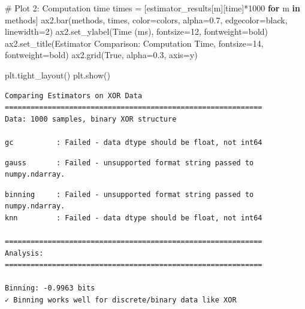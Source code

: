 \documentclass[
  11pt,
  letterpaper,
  oneside,
  openany]{book}
\newenvironment{Shaded}{\begin{snugshade}}{\end{snugshade}}
\newcommand{\CommentTok}[1]{\textcolor[rgb]{0.37,0.37,0.37}{#1}}
\newcommand{\ControlFlowTok}[1]{\textcolor[rgb]{0.00,0.23,0.31}{\textbf{#1}}}
\newcommand{\DecValTok}[1]{\textcolor[rgb]{0.68,0.00,0.00}{#1}}
\newcommand{\FloatTok}[1]{\textcolor[rgb]{0.68,0.00,0.00}{#1}}
\newcommand{\KeywordTok}[1]{\textcolor[rgb]{0.00,0.23,0.31}{\textbf{#1}}}
\newcommand{\NormalTok}[1]{\textcolor[rgb]{0.00,0.23,0.31}{#1}}
\newcommand{\OperatorTok}[1]{\textcolor[rgb]{0.37,0.37,0.37}{#1}}
\newcommand{\StringTok}[1]{\textcolor[rgb]{0.13,0.47,0.30}{#1}}
\newcommand{\VariableTok}[1]{\textcolor[rgb]{0.07,0.07,0.07}{#1}}
\begin{document}
\begin{Shaded}
\begin{Highlighting}[]
    \CommentTok{\# Plot 2: Computation time}
\NormalTok{    times }\OperatorTok{=}\NormalTok{ [estimator\_results[m][}\StringTok{\textquotesingle{}time\textquotesingle{}}\NormalTok{]}\OperatorTok{*}\DecValTok{1000} \ControlFlowTok{for}\NormalTok{ m }\KeywordTok{in}\NormalTok{ methods]}
\NormalTok{    ax2.bar(methods, times, color}\OperatorTok{=}\NormalTok{colors, alpha}\OperatorTok{=}\FloatTok{0.7}\NormalTok{, edgecolor}\OperatorTok{=}\StringTok{\textquotesingle{}black\textquotesingle{}}\NormalTok{, linewidth}\OperatorTok{=}\DecValTok{2}\NormalTok{)}
\NormalTok{    ax2.set\_ylabel(}\StringTok{\textquotesingle{}Time (ms)\textquotesingle{}}\NormalTok{, fontsize}\OperatorTok{=}\DecValTok{12}\NormalTok{, fontweight}\OperatorTok{=}\StringTok{\textquotesingle{}bold\textquotesingle{}}\NormalTok{)}
\NormalTok{    ax2.set\_title(}\StringTok{\textquotesingle{}Estimator Comparison: Computation Time\textquotesingle{}}\NormalTok{, fontsize}\OperatorTok{=}\DecValTok{14}\NormalTok{, fontweight}\OperatorTok{=}\StringTok{\textquotesingle{}bold\textquotesingle{}}\NormalTok{)}
\NormalTok{    ax2.grid(}\VariableTok{True}\NormalTok{, alpha}\OperatorTok{=}\FloatTok{0.3}\NormalTok{, axis}\OperatorTok{=}\StringTok{\textquotesingle{}y\textquotesingle{}}\NormalTok{)}
    
\NormalTok{    plt.tight\_layout()}
\NormalTok{    plt.show()}
\end{Highlighting}
\end{Shaded}

\begin{verbatim}
Comparing Estimators on XOR Data
============================================================
Data: 1000 samples, binary XOR structure

gc          : Failed - data dtype should be float, not int64
\end{verbatim}

\begin{verbatim}
gauss       : Failed - unsupported format string passed to numpy.ndarray.
\end{verbatim}

\begin{verbatim}
binning     : Failed - unsupported format string passed to numpy.ndarray.
knn         : Failed - data dtype should be float, not int64

============================================================
Analysis:
============================================================

Binning: -0.9963 bits
✓ Binning works well for discrete/binary data like XOR
\end{verbatim}
\end{document}
